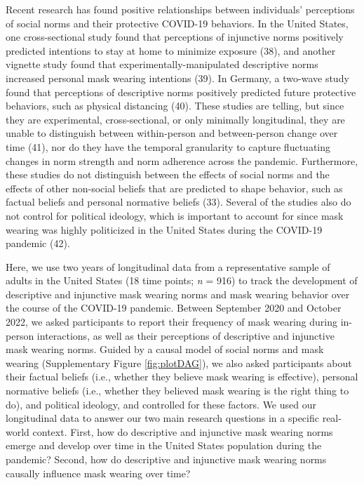 \documentclass[
  man, donotrepeattitle,floatsintext]{apa6}
\begin{document}
Recent research has found positive relationships between individuals' perceptions of social norms and their protective COVID-19 behaviors. In the United States, one cross-sectional study found that perceptions of injunctive norms positively predicted intentions to stay at home to minimize exposure (38), and another vignette study found that experimentally-manipulated descriptive norms increased personal mask wearing intentions (39). In Germany, a two-wave study found that perceptions of descriptive norms positively predicted future protective behaviors, such as physical distancing (40). These studies are telling, but since they are experimental, cross-sectional, or only minimally longitudinal, they are unable to distinguish between within-person and between-person change over time (41), nor do they have the temporal granularity to capture fluctuating changes in norm strength and norm adherence across the pandemic. Furthermore, these studies do not distinguish between the effects of social norms and the effects of other non-social beliefs that are predicted to shape behavior, such as factual beliefs and personal normative beliefs (33). Several of the studies also do not control for political ideology, which is important to account for since mask wearing was highly politicized in the United States during the COVID-19 pandemic (42).

Here, we use two years of longitudinal data from a representative sample of adults in the United States (18 time points; \emph{n} = 916) to track the development of descriptive and injunctive mask wearing norms and mask wearing behavior over the course of the COVID-19 pandemic. Between September 2020 and October 2022, we asked participants to report their frequency of mask wearing during in-person interactions, as well as their perceptions of descriptive and injunctive mask wearing norms. Guided by a causal model of social norms and mask wearing (Supplementary Figure \ref{fig:plotDAG}), we also asked participants about their factual beliefs (i.e., whether they believe mask wearing is effective), personal normative beliefs (i.e., whether they believed mask wearing is the right thing to do), and political ideology, and controlled for these factors. We used our longitudinal data to answer our two main research questions in a specific real-world context. First, how do descriptive and injunctive mask wearing norms emerge and develop over time in the United States population during the pandemic? Second, how do descriptive and injunctive mask wearing norms causally influence mask wearing over time?
\end{document}
